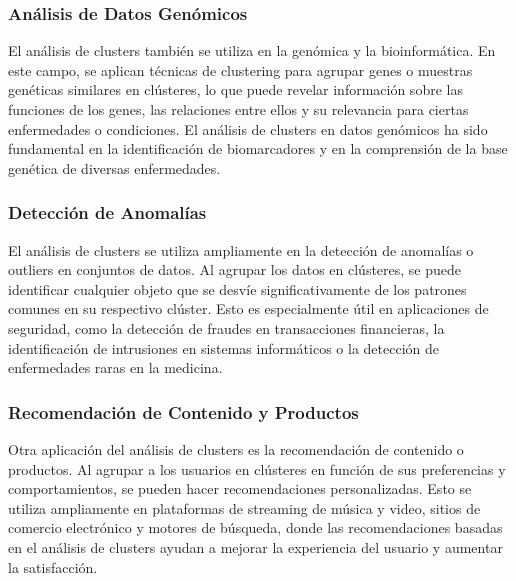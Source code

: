 \documentclass{article}
\begin{document}
\subsubsection{Análisis de Datos Genómicos}
El análisis de clusters también se utiliza en la genómica y la bioinformática. En este campo, se aplican técnicas de clustering para agrupar genes o muestras genéticas similares en clústeres, lo que puede revelar información sobre las funciones de los genes, las relaciones entre ellos y su relevancia para ciertas enfermedades o condiciones. El análisis de clusters en datos genómicos ha sido fundamental en la identificación de biomarcadores y en la comprensión de la base genética de diversas enfermedades.

\subsubsection{Detección de Anomalías}
El análisis de clusters se utiliza ampliamente en la detección de anomalías o outliers en conjuntos de datos. Al agrupar los datos en clústeres, se puede identificar cualquier objeto que se desvíe significativamente de los patrones comunes en su respectivo clúster. Esto es especialmente útil en aplicaciones de seguridad, como la detección de fraudes en transacciones financieras, la identificación de intrusiones en sistemas informáticos o la detección de enfermedades raras en la medicina.

\subsubsection{Recomendación de Contenido y Productos}
Otra aplicación del análisis de clusters es la recomendación de contenido o productos. Al agrupar a los usuarios en clústeres en función de sus preferencias y comportamientos, se pueden hacer recomendaciones personalizadas. Esto se utiliza ampliamente en plataformas de streaming de música y video, sitios de comercio electrónico y motores de búsqueda, donde las recomendaciones basadas en el análisis de clusters ayudan a mejorar la experiencia del usuario y aumentar la satisfacción.

\end{document}
